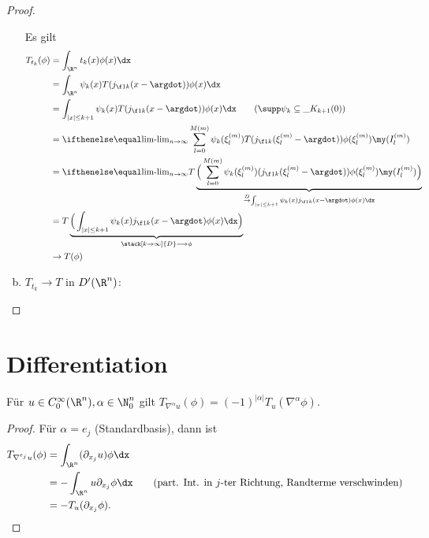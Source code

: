\begin{st}
\begin{proof}
\begin{enumerate}[a)]
				Es gilt
				\begin{align*}
					T_{t_k}(\phi) 
					&= \int_{\R^n} t_k(x) \phi(x) \dx \\
					&= \int_{\R^n} \psi_k(x) T(j_{\f 1k}(x-\argdot)) \phi(x) \dx \\
					&= \int_{|x|\le k+1} \psi_k(x) T(j_{\f 1k}(x-\argdot)) \phi(x) \dx \qquad (\supp \psi_k \subset \_{K_{k+1}(0)}) \\
					&= \lim_{n\to\infty} \sum_{l=0}^{M(m)} \psi_k(\xi_l^{(m)}) T(j_{\f 1k}(\xi_l^{(m)}-\argdot)) \phi(\xi_l^{(m)})\my(I_l^{(m)}) \\
					&= \lim_{n\to\infty} T \underbrace{\Big( \sum_{l=0}^{M(m)} \psi_k(\xi_l^{(m)}) (j_{\f 1k}(\xi_l^{(m)}-\argdot)) \phi(\xi_l^{(m)})\my(I_l^{(m)}) \Big)}_{\overset{D}\to \int_{|x|\le k+1} \psi_k(x) j_{\f 1k}(x-\argdot) \phi(x) \dx} \\
					&= T \underbrace{\Big( \int_{|x|\le k+1} \psi_{k}(x) j_{\f 1k} (x-\argdot) \phi(x) \dx \Big)}_{\stack[k \to \infty]{D}\longrightarrow \phi} \\
					&\to T(\phi)
				\end{align*}
			\item
				$T_{t_k} \to T$ in $D'(\R^n)$:
		\end{enumerate}
	\end{proof}
\end{st}


\section{Differentiation}


\begin{lem} \label{5.11}
	Für $u \in C_0^\infty(\R^n), \alpha \in \N_0^n$ gilt $T_{\nabla^\alpha u} (\phi) = (-1)^{|\alpha|} T_u(\nabla^\alpha \phi)$.
	\begin{proof}
		Für $\alpha = e_j$ (Standardbasis), dann ist
		\begin{align*}
			T_{\nabla^{e_j} u}(\phi) 
			&= \int_{\R^n} (\partial_{x_j} u) \phi \dx \\
			&= - \int_{\R^n} u \partial_{x_j} \phi \dx \qquad \text{(part. Int. in $j$-ter Richtung, Randterme verschwinden)} \\
			&= - T_u (\partial_{x_j} \phi).
		\end{align*}
	\end{proof}
\end{lem}

